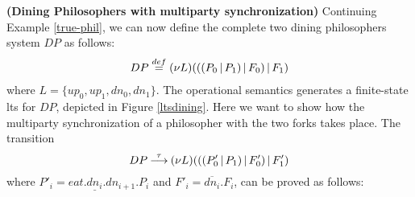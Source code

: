       \begin{example}
	\label{multi-sync-phil}{\bf (Dining Philosophers with multiparty synchronization)}
	Continuing Example \ref{true-phil}, we can now define the complete two dining philosophers system $DP$ as follows:
	\begin{eqnarray*}
	  DP \;  {\mbox{${\stackrel{def}{=}}$}} \;  \mbox{$({\bf\nu} L)$}(((P_0\mbox{$\,|\,$} P_1) \mbox{$\,|\,$} F_0) \mbox{$\,|\,$} F_1) 
	\end{eqnarray*}
	where $L = \{up_0, up_1, dn_0, dn_1\}$. The operational semantics generates a finite-state  lts for $DP$, depicted in Figure \ref{ltsdining}. Here we want to show how the multiparty synchronization of a philosopher with the two forks takes place. The transition 
	\[
	  DP {\mbox{${\:\stackrel{\tau}{\longrightarrow}\:}$}}  \mbox{$({\bf\nu} L)$}(((P'_0\mbox{$\,|\,$} P_1) \mbox{$\,|\,$} F'_0) \mbox{$\,|\,$} F'_1) 
	\]
	where $P'_i = eat.\underline{dn_i}.dn_{i+1}.P_i$ and $F'_i = \overline{dn_i}.F_i$, can be proved as follows:
	\begin{center}


\end{center}
\end{example}

